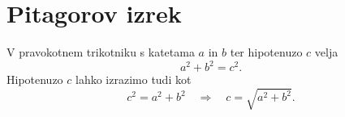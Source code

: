 \documentclass{article}
\begin{document}
\section*{Pitagorov izrek}
V pravokotnem trikotniku s katetama \(a\) in \(b\) ter hipotenuzo \(c\) velja
\[ a^2 + b^2 = c^2. \]
Hipotenuzo \(c\) lahko izrazimo tudi kot
\[ c^2 = a^2 + b^2 \quad \Longrightarrow \quad c = \sqrt{a^2 + b^2}. \]
\end{document}
